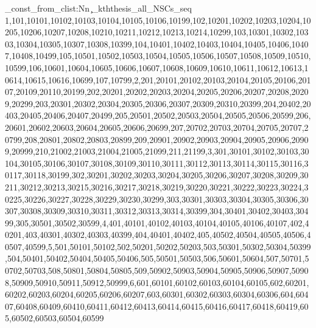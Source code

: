 \seq_const_from_clist:Nn \c_kththesis_all_NSCs_seq { 1,101,10101,10102,10103,10104,10105,10106,10199,102,10201,10202,10203,10204,10205,10206,10207,10208,10210,10211,10212,10213,10214,10299,103,10301,10302,10303,10304,10305,10307,10308,10399,104,10401,10402,10403,10404,10405,10406,10407,10408,10499,105,10501,10502,10503,10504,10505,10506,10507,10508,10509,10510,10599,106,10601,10604,10605,10606,10607,10608,10609,10610,10611,10612,10613,10614,10615,10616,10699,107,10799,2,201,20101,20102,20103,20104,20105,20106,20107,20109,20110,20199,202,20201,20202,20203,20204,20205,20206,20207,20208,20209,20299,203,20301,20302,20304,20305,20306,20307,20309,20310,20399,204,20402,20403,20405,20406,20407,20499,205,20501,20502,20503,20504,20505,20506,20599,206,20601,20602,20603,20604,20605,20606,20699,207,20702,20703,20704,20705,20707,20799,208,20801,20802,20803,20899,209,20901,20902,20903,20904,20905,20906,20909,20999,210,21002,21003,21004,21005,21099,211,21199,3,301,30101,30102,30103,30104,30105,30106,30107,30108,30109,30110,30111,30112,30113,30114,30115,30116,30117,30118,30199,302,30201,30202,30203,30204,30205,30206,30207,30208,30209,30211,30212,30213,30215,30216,30217,30218,30219,30220,30221,30222,30223,30224,30225,30226,30227,30228,30229,30230,30299,303,30301,30303,30304,30305,30306,30307,30308,30309,30310,30311,30312,30313,30314,30399,304,30401,30402,30403,30499,305,30501,30502,30599,4,401,40101,40102,40103,40104,40105,40106,40107,402,40201,403,40301,40302,40303,40399,404,40401,40402,405,40502,40504,40505,40506,40507,40599,5,501,50101,50102,502,50201,50202,50203,503,50301,50302,50304,50399,504,50401,50402,50404,50405,50406,505,50501,50503,506,50601,50604,507,50701,50702,50703,508,50801,50804,50805,509,50902,50903,50904,50905,50906,50907,50908,50909,50910,50911,50912,50999,6,601,60101,60102,60103,60104,60105,602,60201,60202,60203,60204,60205,60206,60207,603,60301,60302,60303,60304,60306,604,60407,60408,60409,60410,60411,60412,60413,60414,60415,60416,60417,60418,60419,605,60502,60503,60504,60599 }


